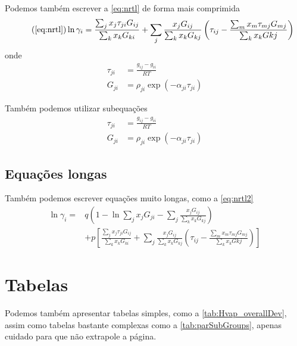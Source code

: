 Podemos também escrever a \autoref{eq:nrtl} de forma mais comprimida
\begin{equation}\tag{\ref{eq:nrtl}}
\ln \gamma_i = \frac{\sum_j x_j \tau_{ji} 
G_{ij}}{\sum_k x_k G_{ki}} + \sum_j \frac{x_j G_{ij}}{\sum_k x_k G_{kj}}\left(
\tau_{ij} - \frac{\sum_m x_m \tau_{mj} G_{mj}}{\sum_k x_k G{kj}} \right)
\end{equation}
onde
\begin{align}
\tau_{ji} &= \frac{g_{ij} - g_{ii}}{RT}\\
G_{ji} &= \rho_{ji} \exp{ \left(-\alpha_{ji} \tau_{ji}\right)} \label{eq:nrtlg}
\end{align}

Também podemos utilizar subequações
\begin{subequations}
\begin{align}
\tau_{ji} &= \frac{g_{ij} - g_{ii}}{RT}\\
G_{ji} &= \rho_{ji} \exp{ \left(-\alpha_{ji} \tau_{ji}\right)} \label{eq:nrtlg}
\end{align}
\end{subequations}


\subsection{Equações longas}
Também podemos escrever equações muito longas, como a \autoref{eq:nrtl2} 
\begin{equation}\label{eq:nrtl2}
\begin{aligned} 
\ln \gamma_i = &q \left(1- \ln \sum_j x_j G_{ji} - \sum_j \frac{x_j
G_{ij}}{\sum_k x_k G_{kj}} \right) \\
&+ p\left[ \frac{\sum_j x_j \tau_{ji}
G_{ij}}{\sum_k x_k G_{ki}} + \sum_j \frac{x_j G_{ij}}{\sum_k x_k G_{kj}}\left(
\tau_{ij} - \frac{\sum_m x_m \tau_{mj} G_{mj}}{\sum_k x_k G{kj}} \right) \right]
\end{aligned}
\end{equation}


\section{Tabelas}
Podemos também apresentar tabelas simples, como a
\autoref{tab:Hvap_overallDev}, assim como tabelas bastante complexas como a
\autoref{tab:parSubGroups}, apenas cuidado para que não extrapole a página.

